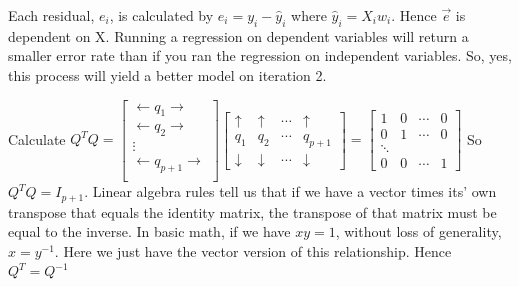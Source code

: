 \documentclass[12pt]{article}
\begin{document}
\begin{enumerate}
Each residual, $e_i$, is calculated by $e_i=y_i-\hat{y}_i$ where $\hat{y}_i=X_iw_i$. Hence $\vec{e}$ is dependent on X. Running a regression on dependent variables will return a smaller error rate than if you ran the regression on independent variables. So, yes, this process will yield a better model on iteration 2.


Calculate $Q^TQ=\begin{bmatrix}
\leftarrow q_1 \rightarrow\\
\leftarrow q_2 \rightarrow\\
\vdots\\
\leftarrow q_{p+1} \rightarrow\\
\end{bmatrix}\begin{bmatrix}
\uparrow & \uparrow & \cdots & \uparrow\\
q_1 & q_2 & \cdots & q_{p+1}\\
\downarrow & \downarrow & \cdots & \downarrow
\end{bmatrix}=\begin{bmatrix}
1 & 0 & \cdots & 0\\
0 & 1 & \cdots & 0\\
\ddots\\
0 & 0 & \cdots & 1
\end{bmatrix}$
So $Q^TQ=I_{p+1}$. Linear algebra rules tell us that if we have a vector times its' own transpose that equals the identity matrix, the transpose of that matrix must be equal to the inverse. In basic math, if we have $xy=1$, without loss of generality, $x=y^{-1}$. Here we just have the vector version of this relationship. Hence $Q^T=Q^{-1}$ 









\end{enumerate}
\end{document}
